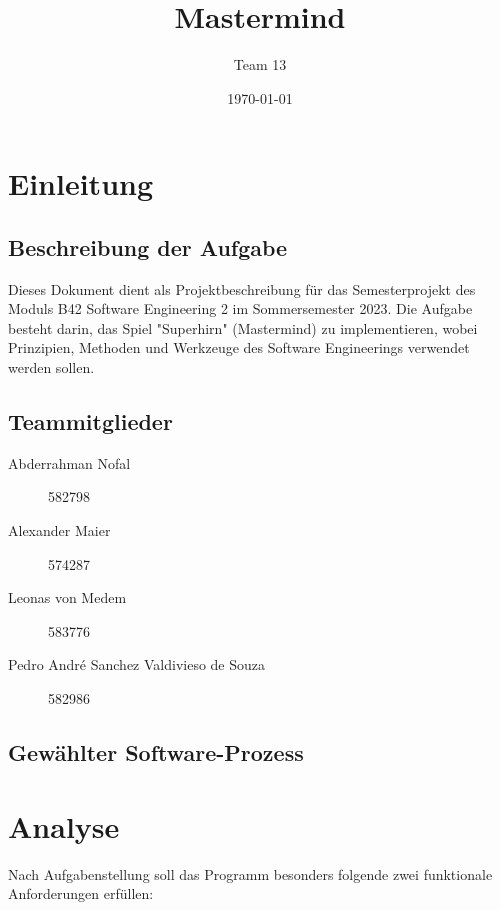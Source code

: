 \documentclass[10pt]{article}
\title{Mastermind}
\author{Team 13}
\date{\today}
\begin{document}
\maketitle

\tableofcontents

\section{Einleitung}
\subsection{Beschreibung der Aufgabe}
Dieses Dokument dient als Projektbeschreibung für das Semesterprojekt des Moduls B42 Software Engineering 2 im Sommersemester 2023.
Die Aufgabe besteht darin, das Spiel "Superhirn" (Mastermind) zu implementieren, wobei Prinzipien, Methoden und Werkzeuge des Software Engineerings verwendet werden sollen.

\subsection{Teammitglieder}
\begin{description}
\item[Abderrahman Nofal] 582798
\item[Alexander Maier] 574287
\item[Leonas von Medem] 583776
\item[Pedro André Sanchez Valdivieso de Souza] 582986
\end{description}

\subsection{Gewählter Software-Prozess}

\section{Analyse}
Nach Aufgabenstellung soll das Programm besonders folgende zwei funktionale Anforderungen erfüllen:
\end{document}
